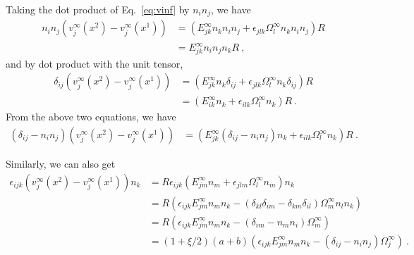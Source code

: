 \documentclass[reprint, amsmath,amssymb,aps,pre,onecolumn,notitlepage%
]{revtex4-1}
\begin{document}
Taking the dot product of Eq.~\eqref{eq:vinf} by $n_in_j$, we have
\begin{equation}
\begin{split}
n_i n_j (v_j^\infty(x^2)-v_j^\infty(x^1))&=\left(E^\infty_{jk}n_k n_i n_j+\epsilon_{jlk}\Omega^\infty_l n_k n_i n_j\right)R\\
&=E^\infty_{jk}n_i n_j n_k  R \ ,
\end{split}
\end{equation}
and by dot product with the unit tensor,
\begin{equation}
\begin{split}
\delta_{ij} (v_j^\infty(x^2)-v_j^\infty(x^1))&=\left(E^\infty_{jk}n_k \delta_{ij}+\epsilon_{jlk}\Omega^\infty_l n_k \delta_{ij}\right)R\\
&=\left(E^\infty_{ik}n_k+\epsilon_{ilk}\Omega^\infty_l n_k \right)R\ .
\end{split}
\end{equation}
From the above two equations, we have
\begin{equation}
\begin{split}
(\delta_{ij}-n_in_j) (v_j^\infty(x^2)-v_j^\infty(x^1))&=\left(E^\infty_{jk}(\delta_{ij}-n_in_j)n_k +\epsilon_{ilk}\Omega^\infty_l n_k \right)R\ .
\end{split}
\end{equation}

Similarly, we can also get
\begin{equation}
\begin{split}
\epsilon_{ijk}(v_j^\infty(x^2)-v_j^\infty(x^1))n_k&=R \epsilon_{ijk}(E^\infty_{jm}n_m+\epsilon_{jlm}\Omega^\infty_ln_m)n_k\\  
&=R \left(\epsilon_{ijk}E^\infty_{jm}n_m n_k - (\delta_{kl} \delta_{im}- \delta_{km} \delta_{il})\Omega^\infty_m n_l n_k  \right)\\
&=R \left(\epsilon_{ijk}E^\infty_{jm}n_m n_k - (\delta_{im}- n_m n_i)\Omega^\infty_m  \right)\\
&=(1+\xi/2)(a+b)\left(\epsilon_{ijk}E^\infty_{jm}n_m n_k - (\delta_{ij}- n_i n_j)\Omega^\infty_j  \right)\ .
\end{split}
\end{equation}
\end{document}
